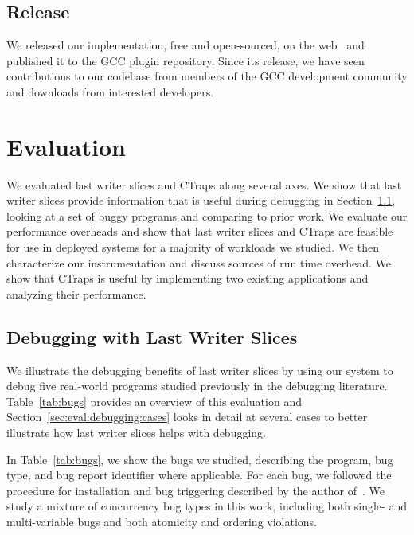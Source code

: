 \documentclass[preprint,9pt]{sigplanconf}
\newcommand{\ctraps}{CTraps\xspace}
\begin{document}
\subsection{Release}
We released our implementation, free and open-sourced, on the
web~\cite{ctrapsrelease} and published it to the GCC plugin repository.
Since its release, we have seen contributions to our codebase from members of
the GCC development community and downloads from interested developers.

\section{Evaluation}
\label{sec:eval}
We evaluated last writer slices and \ctraps along several axes.  We show that
last writer slices provide information that is useful during debugging in
Section~\ref{sec:eval:debugging}, looking at a set of buggy programs and
comparing to prior work.  We evaluate our performance overheads and
show that last writer slices and \ctraps are feasible for use in deployed
systems for a majority of workloads we studied.  We then characterize our
instrumentation and discuss sources of run time overhead.   We
show that \ctraps is useful by implementing two existing applications and
analyzing their performance.    

\subsection{Debugging with Last Writer Slices}
\label{sec:eval:debugging}

We illustrate the debugging benefits of last writer slices by using our system
to debug five real-world programs studied previously in the debugging
literature.  Table~\ref{tab:bugs} provides an overview of this evaluation and
Section~\ref{sec:eval:debugging:cases} looks in detail at several cases to 
better illustrate how last writer slices helps with debugging.

In Table~\ref{tab:bugs}, we show the bugs we studied, describing the program,
bug type, and bug report identifier where applicable.  For each bug, we
followed the procedure for installation and bug triggering described by the
author of~\cite{concurrencybugs}.  We study a mixture of concurrency bug types
in this work, including both single- and multi-variable bugs and both atomicity
and ordering violations.
\end{document}
